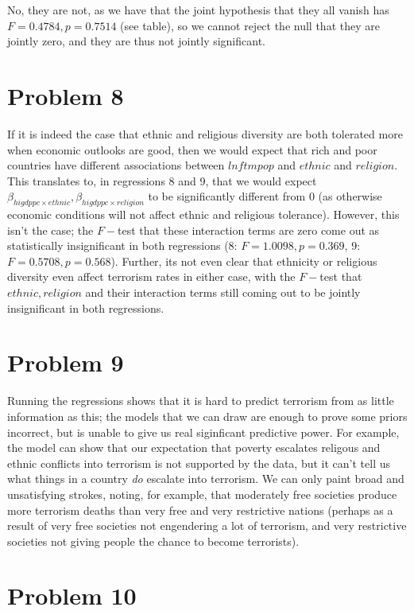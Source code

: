 \documentclass[12pt,letterpaper]{article}
\theoremstyle{definition}
\begin{document}
No, they are not, as we have that the joint hypothesis that they all vanish has $F=  0.4784, p =0.7514$ (see table), so we cannot reject the null that they are jointly zero, and they are thus not jointly significant.


\section*{Problem 8}

If it is indeed the case that ethnic and religious diversity are both tolerated more when economic outlooks are good, then we would expect that rich and poor countries have different associations between $lnftmpop$ and $ethnic$ and $religion$. This translates to, in regressions 8 and 9, that we would expect $\beta_{higdppc \times ethnic}, \beta_{higdppc \times religion}$ to be significantly different from 0 (as otherwise economic conditions will not affect ethnic and religious tolerance). However, this isn't the case; the $F-$test that these interaction terms are zero come out as statistically insignificant in both regressions (8: $F = 1.0098, p = 0.369$, 9: $F = 0.5708, p = 0.568$). Further, its not even clear that ethnicity or religious diversity even affect terrorism rates in either case, with the $F-$test that $ethnic, religion$ and their interaction terms still coming out to be jointly insignificant in both regressions.

\section*{Problem 9}

Running the regressions shows that it is hard to predict terrorism from as little information as this; the models that we can draw are enough to prove some priors incorrect, but is unable to give us real siginficant predictive power. For example, the model can show that our expectation that poverty escalates religous and ethnic conflicts into terrorism is not supported by the data, but it can't tell us what things in a country \textit{do} escalate into terrorism. We can only paint broad and unsatisfying strokes, noting, for example, that moderately free societies produce more terrorism deaths than very free and very restrictive nations (perhaps as a result of very free societies not engendering a lot of terrorism, and very restrictive societies not giving people the chance to become terrorists).

\section*{Problem 10}
\end{document}
